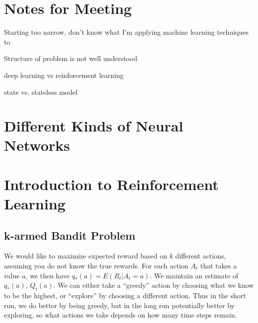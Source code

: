 \documentclass[12pt, reqno]{article}
\theoremstyle{plain}    \newtheorem{theorem}{Theorem}[section]
\theoremstyle{plain}    \newtheorem{lemma}[theorem]{Lemma}
\theoremstyle{plain}    \newtheorem{claim}[theorem]{Claim}
\theoremstyle{plain}    \newtheorem{definition}{Definition}[section]
\theoremstyle{plain}    \newtheorem{proposition}[theorem]{Proposition}
\theoremstyle{plain}    \newtheorem{corollary}[theorem]{Corollary}
\theoremstyle{plain}    \newtheorem{example}[definition]{Example}
\numberwithin{equation}{section}
\begin{document}






\section{Notes for Meeting}
Starting too narrow, don't know what I'm applying machine learning techniques
to

Structure of problem is not well understood

deep learning vs reinforcement learning

state vs. stateless model



\section{Different Kinds of Neural Networks}



\section{Introduction to Reinforcement Learning}

\subsection{k-armed Bandit Problem}
We would like to maximize expected reward based on \(k\) different actions,
assuming you do not know the true rewards.  For
each action \(A_t\) that takes a value \(a\), we then have \(q_* (a) = E(R_t |
A_t = a)\). We maintain an estimate of \(q_*(a)\), \(Q_t(a)\). We can either
take a ``greedy'' action by choosing what we know to be the highest, or ``explore''
by choosing a different action. Thus in the short run, we do better by being
greedy, but in the long run potentially better by exploring, so what actions we
take depends on how many time steps remain. 
\end{document}

